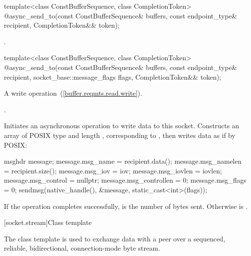 \begin{itemdecl}
template<class ConstBufferSequence, class CompletionToken>
  @\DEDUCED@ async_send_to(const ConstBufferSequence& buffers,
                        const endpoint_type& recipient,
                        CompletionToken&& token);
\end{itemdecl}

\begin{itemdescr}
\pnum
\returns {}.
\end{itemdescr}

\begin{itemdecl}
template<class ConstBufferSequence, class CompletionToken>
  @\DEDUCED@ async_send_to(const ConstBufferSequence& buffers,
                        const endpoint_type& recipient,
                        socket_base::message_flags flags,
                        CompletionToken&& token);
\end{itemdecl}

\begin{itemdescr}
\pnum
A write operation~(\ref{buffer.reqmts.read.write}).

\pnum
\completionsig {}.

\pnum
\effects Initiates an asynchronous operation to write data to this socket. Constructs an array  of POSIX type  and length , corresponding to , then writes data as if by POSIX: 
\begin{codeblock}
msghdr message;
message.msg_name = recipient.data();
message.msg_namelen = recipient.size();
message.msg_iov = iov;
message.msg_iovlen = iovlen;
message.msg_control = nullptr;
message.msg_controllen = 0;
message.msg_flags = 0;
sendmsg(native_handle(), &message, static_cast<int>(flags));
\end{codeblock}


\pnum
If the operation completes successfully,  is the number of bytes sent. Otherwise  is .
\end{itemdescr}




%
[socket.stream]{Class template }

\pnum
The class template  is used to exchange data with a peer over a sequenced, reliable, bidirectional, connection-mode byte stream.

